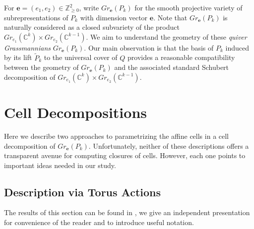 \documentclass{amsart}
\numberwithin{equation}{section}
\newcommand{\CC}{\mathbb{C}}
\newcommand{\ZZ}{\mathbb{Z}}
\newcommand{\bfe}{\mathbf{e}}
\begin{document}
  For $\bfe=(e_1,e_2)\in\ZZ_{\ge0}^2$, write $Gr_\bfe(P_k)$ for the smooth projective variety of subrepresentations of $P_k$ with dimension vector $\bfe$.
  Note that $Gr_\bfe(P_k)$ is naturally considered as a closed subvariety of the product $Gr_{e_1}(\CC^k)\times Gr_{e_2}(\CC^{k-1})$.
  We aim to understand the geometry of these \emph{quiver Grassmannians} $Gr_\bfe(P_k)$.
  Our main observation is that the basis of $P_k$ induced by its lift $\widetilde P_k$ to the universal cover of $Q$ provides a reasonable compatibility between the geometry of $Gr_\bfe(P_k)$ and the associated standard Schubert decomposition of $Gr_{e_1}(\CC^k)\times Gr_{e_2}(\CC^{k-1})$.

  \section{Cell Decompositions}
  Here we describe two approaches to parametrizing the affine cells in a cell decomposition of $Gr_\bfe(P_k)$.
  Unfortunately, neither of these descriptions offers a transparent avenue for computing closures of cells.
  However, each one points to important ideas needed in our study.

  \subsection{Description via Torus Actions}
  The results of this section can be found in \cite{cerulli irelli-esposito}, we give an independent presentation for convenience of the reader and to introduce useful notation.
\end{document}
